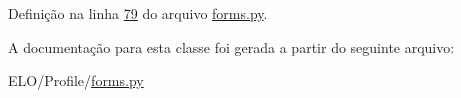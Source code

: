 Definição na linha \hyperlink{Profile_2forms_8py_source_l00079}{79} do arquivo \hyperlink{Profile_2forms_8py_source}{forms.\-py}.



A documentação para esta classe foi gerada a partir do seguinte arquivo\-:\begin{DoxyCompactItemize}
\item 
E\-L\-O/\-Profile/\hyperlink{Profile_2forms_8py}{forms.\-py}\end{DoxyCompactItemize}
